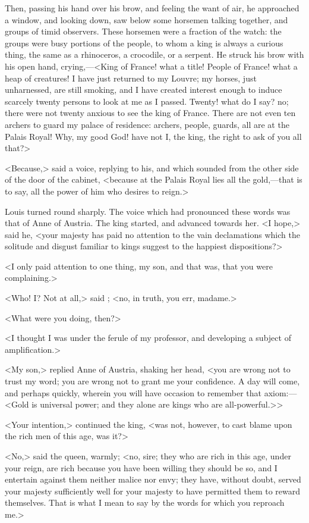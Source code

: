 Then, passing his hand over his brow, and feeling the want of air, he approached a window, and looking down, saw below some horsemen talking together, and groups of timid observers. These horsemen were a fraction of the watch: the groups were busy portions of the people, to whom a king is always a curious thing, the same as a rhinoceros, a crocodile, or a serpent. He struck his brow with his open hand, crying,—<King of France! what a title! People of France! what a heap of creatures! I have just returned to my Louvre; my horses, just unharnessed, are still smoking, and I have created interest enough to induce scarcely twenty persons to look at me as I passed. Twenty! what do I say? no; there were not twenty anxious to see the king of France. There are not even ten archers to guard my palace of residence: archers, people, guards, all are at the Palais Royal! Why, my good God! have not I, the king, the right to ask of you all that?>

<Because,> said a voice, replying to his, and which sounded from the other side of the door of the cabinet, <because at the Palais Royal lies all the gold,—that is to say, all the power of him who desires to reign.>

Louis turned round sharply. The voice which had pronounced these words was that of Anne of Austria. The king started, and advanced towards her. <I hope,> said he, <your majesty has paid no attention to the vain declamations which the solitude and disgust familiar to kings suggest to the happiest dispositions?>

<I only paid attention to one thing, my son, and that was, that you were complaining.>

<Who! I\@? Not at all,> said ; <no, in truth, you err, madame.>

<What were you doing, then?>

<I thought I was under the ferule of my professor, and developing a subject of amplification.>

<My son,> replied Anne of Austria, shaking her head, <you are wrong not to trust my word; you are wrong not to grant me your confidence. A day will come, and perhaps quickly, wherein you will have occasion to remember that axiom:—<Gold is universal power; and they alone are kings who are all-powerful.>>

<Your intention,> continued the king, <was not, however, to cast blame upon the rich men of this age, was it?>

<No,> said the queen, warmly; <no, sire; they who are rich in this age, under your reign, are rich because you have been willing they should be so, and I entertain against them neither malice nor envy; they have, without doubt, served your majesty sufficiently well for your majesty to have permitted them to reward themselves. That is what I mean to say by the words for which you reproach me.>

